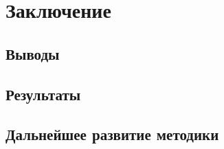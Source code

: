 \chapter{Заключение}

\section{Выводы}



\section{Результаты}



\section{Дальнейшее развитие методики}


